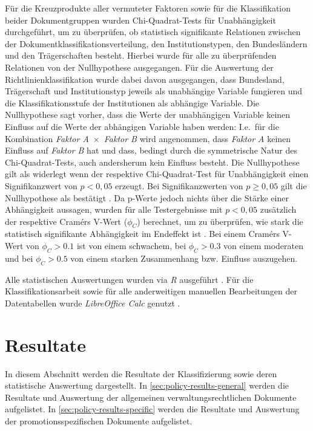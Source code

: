 Für die Kreuzprodukte aller vermuteter Faktoren sowie für die Klassifikation beider Dokumentgruppen wurden Chi-Quadrat-Tests für Unabhängigkeit durchgeführt, um zu überprüfen, ob statistisch signifikante Relationen zwischen der Dokumentklassifikationsverteilung, den Institutionstypen, den Bundesländern und den Trägerschaften besteht.
Hierbei wurde für alle zu überprüfenden Relationen von der Nullhypothese ausgegangen.
Für die Auswertung der Richtlinienklassifikation wurde dabei davon ausgegangen, dass Bundesland, Trägerschaft und Institutionstyp jeweils als unabhängige Variable fungieren und die Klassifikationsstufe der Institutionen als abhängige Variable.
Die Nullhypothese sagt vorher, dass die Werte der unabhängigen Variable keinen Einfluss auf die Werte der abhängigen Variable haben werden:
I.e.~für die Kombination \textit{Faktor A}~$\times$~\textit{Faktor B} wird angenommen, dass \textit{Faktor A} keinen Einfluss auf \textit{Faktor B} hat und dass, bedingt durch die symmetrische Natur des Chi-Quadrat-Tests, auch andersherum kein Einfluss besteht.
Die Nullhypothese gilt als widerlegt wenn der respektive Chi-Quadrat-Test für Unabhängigkeit einen Signifikanzwert von $p<0,05$ erzeugt.
Bei Signifikanzwerten von $p\geqslant0,05$ gilt die Nullhypothese als bestätigt \autocite{Pearson1900,Pearson1904}.
Da p-Werte jedoch nichts über die Stärke einer Abhängigkeit aussagen, wurden für alle Testergebnisse mit $p<0,05$ zusätzlich der respektive Cramérs V-Wert ($\phi_C$) berechnet, um zu überprüfen, wie stark die statistisch signifikante Abhängigkeit im Endeffekt ist \autocite{Cramer1946}.
Bei einem Cramérs V-Wert von $\phi_C>\num{0,1}$ ist von einem schwachem, bei $\phi_C>\num{0,3}$ von einem moderaten und bei $\phi_C>\num{0,5}$ von einem starken Zusammenhang bzw. Einfluss auszugehen.

Alle statistischen Auswertungen wurden via \textit{R} ausgeführt \autocite{r,dplyr,my-dataset}.
Für die Klassifikationsarbeit sowie für alle anderweitigen manuellen Bearbeitungen der Datentabellen wurde \textit{LibreOffice Calc} genutzt \autocite{libreoffice}.

\section{Resultate}\label{sec:policy-results}
In diesem Abschnitt werden die Resultate der Klassifizierung sowie deren statistische Auswertung dargestellt.
In \cref{sec:policy-results-general} werden die Resultate und Auswertung der allgemeinen verwaltungsrechtlichen Dokumente aufgelistet.
In \cref{sec:policy-results-specific} werden die Resultate und Auswertung der promotionsspezifischen Dokumente aufgelistet.

